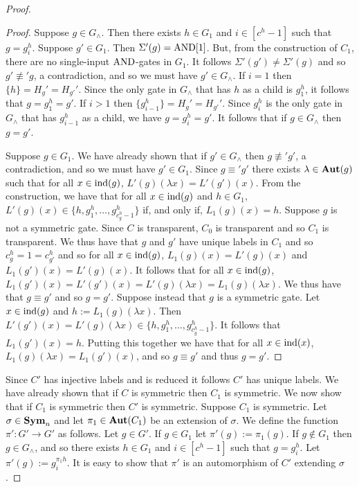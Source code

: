 \documentclass[../main/thesis.tex]{subfiles}
\begin{document}
\begin{proof}
\begin{proof}
    Suppose $g \in G_{\land}$. Then there exists $h \in G_1$ and $i \in [c^h -
    1]$ such that $g = g^h_i$. Suppose $g' \in G_1$. Then $\Sigma'(g) =
    \text{\upshape AND}[1]$. But, from the construction of $C_1$, there are no single-input
    $\text{\upshape AND}$-gates in $G_1$. It follows $\Sigma'(g') \neq \Sigma'(g)$ and so $g'
    \not\equiv' g$, a contradiction, and so we must have $g' \in G_{\land}$. If
    $i = 1$ then $\{ h \} = H_g' = H_{g'}'$. Since the only gate in $G_\land$
    that has $h$ as a child is $g^h_1$, it follows that $g = g^h_1 = g'$. If $i
    > 1$ then $\{g^{h}_{i-1}\} = H_g' = H_{g'}'$. Since $g^h_i$ is the only gate
    in $G_\land$ that has $g^h_{i-1}$ as a child, we have $g = g^h_i = g'$. It
    follows that if $g \in G_\land$ then $g = g'$.

    Suppose $g \in G_1$. We have already shown that if $g' \in G_\land$ then $g
    \not\equiv' g'$, a contradiction, and so we must have $g' \in G_1$. Since $g
    \equiv' g'$ there exists $\lambda \in \text{\textbf{Aut}}(g)$ such that for all $x \in
    \text{\upshape ind}(g)$, $L'(g)(\lambda x) = L'(g')(x)$. From the construction, we have
    that for all $x \in \text{\upshape ind}(g)$ and $h \in G_1$, $L'(g)(x) \in \{h, g^h_1 ,
    \ldots, g^h_{c^h_g -1}\}$ if, and only if, $L_1(g)(x) = h$. Suppose $g$ is
    not a symmetric gate. Since $C$ is transparent, $C_0$ is transparent and so
    $C_1$ is transparent. We thus have that $g$ and $g'$ have unique labels in
    $C_1$ and so $c^h_g = 1 = c^h_{g'}$ and so for all $x \in \text{\upshape ind}(g)$,
    $L_1(g)(x) = L'(g)(x)$ and $L_1(g')(x) = L'(g)(x)$. It follows that for all
    $x \in \text{\upshape ind}(g)$, $L_1(g')(x) = L'(g')(x) = L'(g)(\lambda x) = L_1(g)(\lambda
    x)$. We thus have that $g \equiv g'$ and so $g = g'$. Suppose instead that
    $g$ is a symmetric gate. Let $x \in \text{\upshape ind}(g)$ and $h := L_1(g)(\lambda x)$.
    Then $L' (g')(x) = L'(g)(\lambda x) \in \{h, g^h_1, \ldots , g^h_{c^h_g -
      1}\}$. It follows that $L_1(g')(x) = h$. Putting this together we have
    that for all $x \in \text{\upshape ind}(x)$, $L_1(g) (\lambda x) = L_1(g')(x)$, and so $g
    \equiv g'$ and thus $g = g'$.
  \end{proof}
  
  Since $C'$ has injective labels and is reduced it follows $C'$ has unique
  labels. We have already shown that if $C$ is symmetric then $C_1$ is
  symmetric. We now show that if $C_1$ is symmetric then $C'$ is symmetric.
  Suppose $C_1$ is symmetric. Let $\sigma \in \text{\textbf{Sym}}_n$ and let $\pi_1 \in
  \text{\textbf{Aut}}(C_1)$ be an extension of $\sigma$. We define the function $\pi' : G'
  \rightarrow G'$ as follows. Let $g \in G'$. If $g \in G_1$ let $\pi'(g) :=
  \pi_1(g)$. If $g \not\in G_1$ then $g \in G_\land$, and so there exists $h \in
  G_1$ and $i \in [c^h - 1]$ such that $g = g^h_i$. Let $\pi'(g) := g^{\pi_1
    h}_i$. It is easy to show that $\pi'$ is an automorphism of $C'$ extending
  $\sigma$.


\end{proof}
\end{document}
